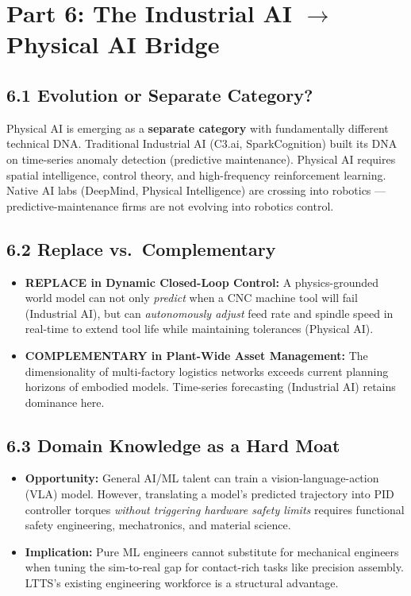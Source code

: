 \documentclass[11pt,a4paper]{article}
\begin{document}
\section{Part 6: The Industrial AI \texorpdfstring{$\rightarrow$}{to} Physical AI Bridge}

\subsection{6.1 Evolution or Separate Category?}
Physical AI is emerging as a \textbf{separate category} with fundamentally different technical DNA. Traditional Industrial AI (C3.ai, SparkCognition) built its DNA on time-series anomaly detection (predictive maintenance). Physical AI requires spatial intelligence, control theory, and high-frequency reinforcement learning. Native AI labs (DeepMind, Physical Intelligence) are crossing into robotics --- predictive-maintenance firms are not evolving into robotics control.

\subsection{6.2 Replace vs.\ Complementary}
\begin{itemize}
    \item \textbf{REPLACE in Dynamic Closed-Loop Control:} A physics-grounded world model can not only \textit{predict} when a CNC machine tool will fail (Industrial AI), but can \textit{autonomously adjust} feed rate and spindle speed in real-time to extend tool life while maintaining tolerances (Physical AI).
    \item \textbf{COMPLEMENTARY in Plant-Wide Asset Management:} The dimensionality of multi-factory logistics networks exceeds current planning horizons of embodied models. Time-series forecasting (Industrial AI) retains dominance here.
\end{itemize}

\subsection{6.3 Domain Knowledge as a Hard Moat}
\begin{itemize}
    \item \textbf{Opportunity:} General AI/ML talent can train a vision-language-action (VLA) model. However, translating a model's predicted trajectory into PID controller torques \textit{without triggering hardware safety limits} requires functional safety engineering, mechatronics, and material science.
    \item \textbf{Implication:} Pure ML engineers cannot substitute for mechanical engineers when tuning the sim-to-real gap for contact-rich tasks like precision assembly. LTTS's existing engineering workforce is a structural advantage.
\end{itemize}
\end{document}
